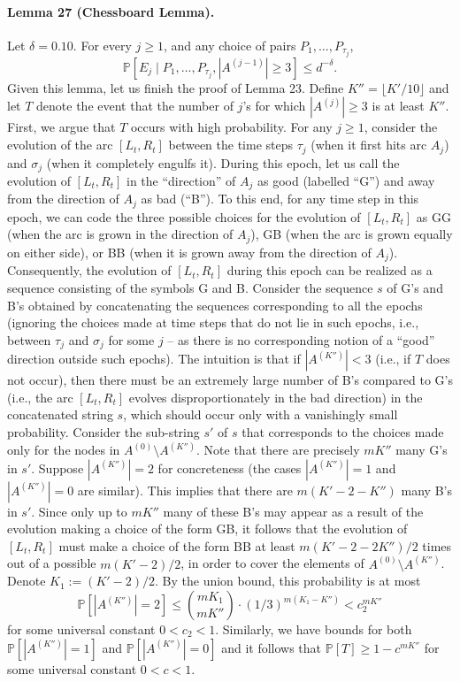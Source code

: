 \paragraph{Lemma 27 (Chessboard Lemma).} Let $\delta=0.10$. For every $j\geq1$, and any choice of pairs $P_1,\ldots,P_{\tau_j}$,
\[\mathbb P[E_j\mid P_1,\ldots,P_{\tau_j},|A^{(j-1)}|\geq3]\leq d^{-\delta}.\]
Given this lemma, let us finish the proof of Lemma 23. Define $K''=\lfloor K'/10\rfloor$ and let $T$ denote the event that the number of $j$'s for which $|A^{(j)}|\geq3$ is at least $K''$. First, we argue that $T$ occurs with high probability.
For any $j\geq1$, consider the evolution of the arc $[L_t,R_t]$ between the time steps $\tau_j$ (when it first hits arc $A_j$) and $\sigma_j$ (when it completely engulfs it). During this epoch, let us call the evolution of $[L_t,R_t]$ in the ``direction'' of $A_j$ as good (labelled ``G'') and away from the direction of $A_j$ as bad (``B''). To this end, for any time step in this epoch, we can code the three possible choices for the evolution of $[L_t,R_t]$ as GG (when the arc is grown in the direction of $A_j$), GB (when the arc is grown equally on either side), or BB (when it is grown away from the direction of $A_j$). Consequently, the evolution of $[L_t,R_t]$ during this epoch can be realized as a sequence consisting of the symbols G and B.
Consider the sequence $s$ of G's and B's obtained by concatenating the sequences corresponding to all the epochs (ignoring the choices made at time steps that do not lie in such epochs, i.e., between $\tau_j$ and $\sigma_j$ for some $j$ -- as there is no corresponding notion of a ``good'' direction outside such epochs). The intuition is that if $|A^{(K'')}|<3$ (i.e., if $T$ does not occur), then there must be an extremely large number of B's compared to G's (i.e., the arc $[L_t,R_t]$ evolves disproportionately in the bad direction) in the concatenated string $s$, which should occur only with a vanishingly small probability.
Consider the sub-string $s'$ of $s$ that corresponds to the choices made only for the nodes in $A^{(0)}\setminus A^{(K'')}$. Note that there are precisely $mK''$ many G's in $s'$. Suppose $|A^{(K'')}|=2$ for concreteness (the cases $|A^{(K'')}|=1$ and $|A^{(K'')}|=0$ are similar). This implies that there are $m(K'-2-K'')$ many B's in $s'$. Since only up to $mK''$ many of these B's may appear as a result of the evolution making a choice of the form GB, it follows that the evolution of $[L_t,R_t]$ must make a choice of the form BB at least $m(K'-2-2K'')/2$ times out of a possible $m(K'-2)/2$, in order to cover the elements of $A^{(0)}\setminus A^{(K'')}$. Denote $K_1:=(K'-2)/2$. By the union bound, this probability is at most
\[\mathbb P[|A^{(K'')}|=2]\leq\binom{mK_1}{mK''}\cdot(1/3)^{m(K_1-K'')}<c_2^{mK''}\]
for some universal constant $0<c_2<1$. Similarly, we have bounds for both $\mathbb P[|A^{(K'')}|=1]$ and $\mathbb P[|A^{(K'')}|=0]$ and it follows that $\mathbb P[T]\geq1-c^{mK''}$ for some universal constant $0<c<1$.
